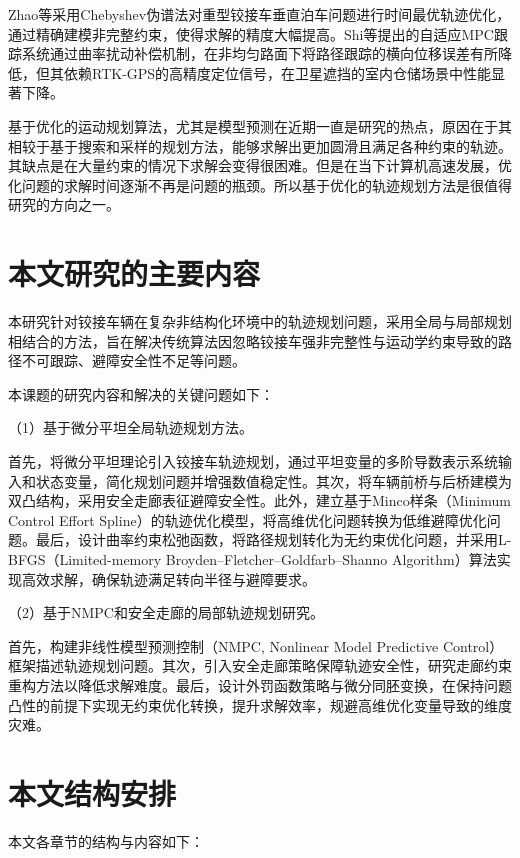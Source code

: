 \documentclass[master,academic]{ysuthesis} %
\begin{document}
	Zhao等采用Chebyshev伪谱法对重型铰接车垂直泊车问题进行时间最优轨迹优化，通过精确建模非完整约束，使得求解的精度大幅提高。Shi等提出的自适应MPC跟踪系统通过曲率扰动补偿机制，在非均匀路面下将路径跟踪的横向位移误差有所降低，但其依赖RTK-GPS的高精度定位信号，在卫星遮挡的室内仓储场景中性能显著下降。
	
	基于优化的运动规划算法，尤其是模型预测在近期一直是研究的热点，原因在于其相较于基于搜索和采样的规划方法，能够求解出更加圆滑且满足各种约束的轨迹。其缺点是在大量约束的情况下求解会变得很困难。但是在当下计算机高速发展，优化问题的求解时间逐渐不再是问题的瓶颈。所以基于优化的轨迹规划方法是很值得研究的方向之一。

	\section{本文研究的主要内容}
	本研究针对铰接车辆在复杂非结构化环境中的轨迹规划问题，采用全局与局部规划相结合的方法，旨在解决传统算法因忽略铰接车强非完整性与运动学约束导致的路径不可跟踪、避障安全性不足等问题。

	本课题的研究内容和解决的关键问题如下：

	（1）基于微分平坦全局轨迹规划方法。

	首先，将微分平坦理论引入铰接车轨迹规划，通过平坦变量的多阶导数表示系统输入和状态变量，简化规划问题并增强数值稳定性。其次，将车辆前桥与后桥建模为双凸结构，采用安全走廊表征避障安全性。此外，建立基于Minco样条（Minimum Control Effort Spline）的轨迹优化模型，将高维优化问题转换为低维避障优化问题。最后，设计曲率约束松弛函数，将路径规划转化为无约束优化问题，并采用L-BFGS（Limited-memory Broyden–Fletcher–Goldfarb–Shanno Algorithm）算法实现高效求解，确保轨迹满足转向半径与避障要求。

	（2）基于NMPC和安全走廊的局部轨迹规划研究。

	首先，构建非线性模型预测控制（NMPC, Nonlinear Model Predictive Control）框架描述轨迹规划问题。其次，引入安全走廊策略保障轨迹安全性，研究走廊约束重构方法以降低求解难度。最后，设计外罚函数策略与微分同胚变换，在保持问题凸性的前提下实现无约束优化转换，提升求解效率，规避高维优化变量导致的维度灾难。

	\section{本文结构安排}
	本文各章节的结构与内容如下：
\end{document}
